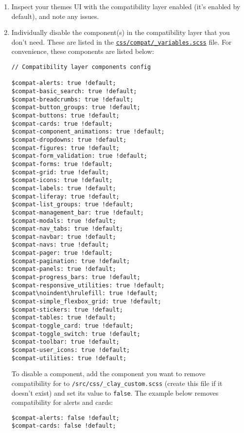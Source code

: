 \begin{enumerate}
\def\labelenumi{\arabic{enumi}.}
\item
  Inspect your themes UI with the compatibility layer enabled (it's
  enabled by default), and note any issues.
\item
  Individually disable the component(s) in the compatibility layer that
  you don't need. These are listed in the
  \href{https://github.com/liferay/liferay-portal/blob/7.2.x/modules/apps/frontend-theme/frontend-theme-styled/src/main/resources/META-INF/resources/_styled/css/compat/_variables.scss}{\texttt{css/compat/\_variables.scss}}
  file. For convenience, these components are listed below:

\begin{verbatim}
// Compatibility layer components config

$compat-alerts: true !default;
$compat-basic_search: true !default;
$compat-breadcrumbs: true !default;
$compat-button_groups: true !default;
$compat-buttons: true !default;
$compat-cards: true !default;
$compat-component_animations: true !default;
$compat-dropdowns: true !default;
$compat-figures: true !default;
$compat-form_validation: true !default;
$compat-forms: true !default;
$compat-grid: true !default;
$compat-icons: true !default;
$compat-labels: true !default;
$compat-liferay: true !default;
$compat-list_groups: true !default;
$compat-management_bar: true !default;
$compat-modals: true !default;
$compat-nav_tabs: true !default;
$compat-navbar: true !default;
$compat-navs: true !default;
$compat-pager: true !default;
$compat-pagination: true !default;
$compat-panels: true !default;
$compat-progress_bars: true !default;
$compat-responsive_utilities: true !default;
$compat\noindent\hrulefill: true !default;
$compat-simple_flexbox_grid: true !default;
$compat-stickers: true !default;
$compat-tables: true !default;
$compat-toggle_card: true !default;
$compat-toggle_switch: true !default;
$compat-toolbar: true !default;
$compat-user_icons: true !default;
$compat-utilities: true !default;
\end{verbatim}

  To disable a component, add the component you want to remove
  compatibility for to \texttt{/src/css/\_clay\_custom.scss} (create
  this file if it doesn't exist) and set its value to \texttt{false}.
  The example below removes compatibility for alerts and cards:

\begin{verbatim}
$compat-alerts: false !default;
$compat-cards: false !default;
\end{verbatim}
\end{enumerate}

